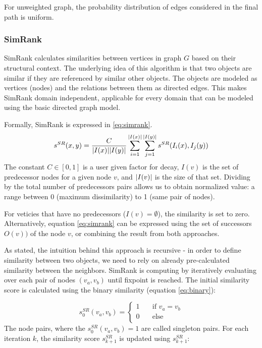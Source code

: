 For unweighted graph, the probability distribution of edges considered in the final path is uniform.

\subsubsection{SimRank}
SimRank calculates similarities between vertices in graph $G$ based on their structural context\cite{Jeh02simrank:a}.
The underlying idea of this algorithm is that two objects are similar if they are referenced by similar other objects. 
The objects are modeled as vertices (nodes) and the relations between them as directed edges.
This makes SimRank domain independent, applicable for every domain that can be modeled using the basic directed graph model.

Formally, SimRank is expressed in \ref{eq:simrank}.
\begin{equation}
	s^{SR}(x,y) = \dfrac{C}{\arrowvert I(x)\arrowvert \arrowvert I(y)\arrowvert}
	\sum_{i=1}^{\arrowvert I(x)\arrowvert}
	\sum_{j=1}^{\arrowvert I(y)\arrowvert}s^{SR}(I_{i}(x), I_{j}(y))
	\label{eq:simrank}
\end{equation}
The constant $C \in [0,1]$ is a user given factor for decay, $I(v)$ is the set of predecessor nodes for a given node $v$, 
and $\arrowvert I(v)\arrowvert$ is the size of that set.
Dividing by the total number of predecessors pairs allows us to obtain normalized value: 
a range between 0 (maximum dissimilarity) to 1 (same pair of nodes). 

For veticies that have no predecessors ($I(v)=\emptyset$), the similarity is set to zero.
Alternatively, equation \ref{eq:simrank} can be expressed using the set of successors $O(v))$ of the node $v$,
or combining the result from both approaches.

As stated, the intuition behind this approach is recursive - 
in order to define similarity between two objects, we need to rely on already pre-calculated similarity between the neighbors.
SimRank is computing by iteratively evaluating over each pair of nodes $(v_{a},v_{b})$ until fixpoint is reached. 
The initial similarity score is  calculated using the binary similarity (equation \ref{eq:binary}):

\begin{equation}
	s_{0}^{SR}(v_{a},v_{b}) = \begin{cases}
	1  & \quad \text{if } v_{a}=v_{b} \\
	0  & \quad \text{else }\\
	\end{cases}
\end{equation}
The node pairs, where the $s_{0}^{SR}(v_{a},v_{b})=1$ are called singleton pairs.
For each iteration $k$, the similarity score $s_{k+1}^{SR}$ is updated using $s_{k+1}^{SR}$:

